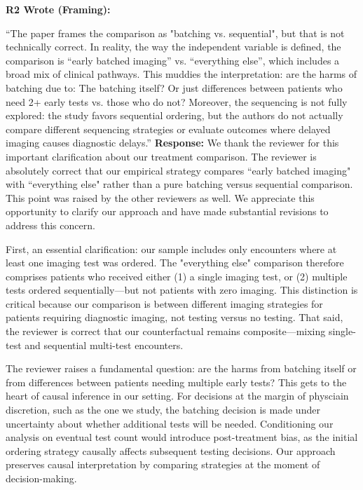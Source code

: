 \documentclass[11pt]{article}
\newenvironment{quote2}
{ \bigskip
\noindent
         \small\em
         \baselineskip=14pt
}
\newcommand{\1}{\hbox{\rm 1\kern-.35em 1}}
\begin{document}
{\begin{quote2}
\textbf{R2 Wrote (Framing):}  


\noindent``The paper frames the comparison as "batching vs. sequential", but that is not technically correct. In reality, the way the independent variable is defined, the comparison is “early batched imaging” vs. “everything else”, which includes a broad mix of clinical pathways. This muddies the interpretation: are the harms of batching due to: The batching itself? Or just differences between patients who need 2+ early tests vs. those who do not? Moreover, the sequencing is not fully explored: the study favors sequential ordering, but the authors do not actually compare different sequencing strategies or evaluate outcomes where delayed imaging causes diagnostic delays.”
\end{quote2}


\noindent\textbf{Response:} \color{blue}We thank the reviewer for this important clarification about our treatment comparison. The reviewer is absolutely correct that our empirical strategy compares ``early batched imaging" with ``everything else" rather than a pure batching versus sequential comparison. This point was raised by the other reviewers as well. We appreciate this opportunity to clarify our approach and have made substantial revisions to address this concern.

First, an essential clarification: our sample includes only encounters where at least one imaging test was ordered. The "everything else" comparison therefore comprises patients who received either (1) a single imaging test, or (2) multiple tests ordered sequentially—but not patients with zero imaging. This distinction is critical because our comparison is between different imaging strategies for patients requiring diagnostic imaging, not testing versus no testing. That said, the reviewer is correct that our counterfactual remains composite—mixing single-test and sequential multi-test encounters.

The reviewer raises a fundamental question: are the harms from batching itself or from differences between patients needing multiple early tests? This gets to the heart of causal inference in our setting. For decisions at the margin of physciain discretion, such as the one we study, the batching decision is made under uncertainty about whether additional tests will be needed. Conditioning our analysis on eventual test count would introduce post-treatment bias, as the initial ordering strategy causally affects subsequent testing decisions. Our approach preserves causal interpretation by comparing strategies at the moment of decision-making.

}
\end{document}
